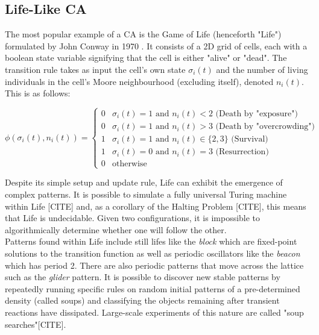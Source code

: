 \subsection{Life-Like CA} \label{sub:life}
The most popular example of a CA is the Game of Life (henceforth "Life") formulated by John Conway in 1970 \cite{gardner1970fantastic}. It consists of a 2D grid of cells, each with a boolean state variable signifying that the cell is either "alive" or "dead". The transition rule takes as input the cell's own state $\sigma_i(t)$ and the number of living individuals in the cell's Moore neighbourhood (excluding itself), denoted $n_i(t)$. This is as follows:

\begin{equation}
  \phi(\sigma_i(t), n_i(t)) = 
\begin{cases}
  0 & \sigma_i(t) = 1 \text{ and } n_i(t) < 2 \text{  (Death by "exposure")}\\
  0 & \sigma_i(t) = 1 \text{ and } n_i(t) > 3 \text{  (Death by "overcrowding")}\\
  1 & \sigma_i(t) = 1 \text{ and } n_i(t) \in \{2,3\} \text{  (Survival)}\\
  1 & \sigma_i(t) = 0 \text{ and } n_i(t) = 3 \text{  (Resurrection)}\\
  0 & \text{otherwise}
\end{cases}
\end{equation}

Despite its simple setup and update rule, Life can exhibit the emergence of complex patterns. It is possible to simulate a fully universal Turing machine within Life [CITE] and, as a corollary of the Halting Problem [CITE], this means that Life is undecidable. Given two configurations, it is impossible to algorithmically determine whether one will follow the other.\\

Patterns found within Life include still lifes like the \textit{block} which are fixed-point solutions to the transition function as well as periodic oscillators like the \textit{beacon} which has period 2. There are also periodic patterns that move across the lattice such as the \textit{glider} pattern. It is possible to discover new stable patterns by repeatedly running specific rules on random initial patterns of a pre-determined density (called soups) and classifying the objects remaining after transient reactions have dissipated. Large-scale experiments of this nature are called "soup searches"[CITE].\\

